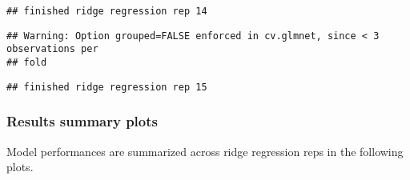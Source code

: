 \documentclass[]{article}
\begin{document}
\begin{verbatim}
## finished ridge regression rep 14
\end{verbatim}

\begin{verbatim}
## Warning: Option grouped=FALSE enforced in cv.glmnet, since < 3 observations per
## fold
\end{verbatim}

\begin{verbatim}
## finished ridge regression rep 15
\end{verbatim}

\hypertarget{results-summary-plots-1}{%
\subsubsection{Results summary plots}\label{results-summary-plots-1}}

Model performances are summarized across ridge regression reps in the
following plots.
\end{document}
